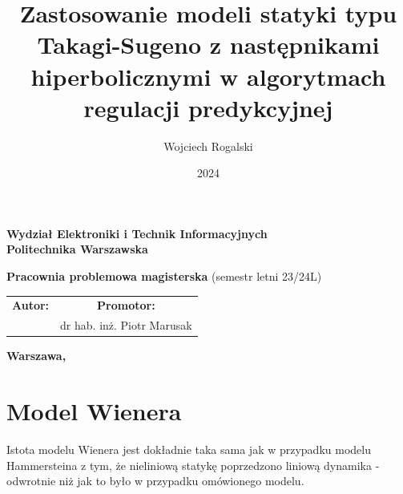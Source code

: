 \documentclass[a4paper,titlepage,11pt,floatssmall]{mwrep}
\begin{document}
\frenchspacing
\pagestyle{uheadings}

\title{\bf Zastosowanie modeli statyki typu Takagi-Sugeno z następnikami hiperbolicznymi w algorytmach regulacji predykcyjnej}
\author{Wojciech Rogalski}
\date{2024}

\makeatletter
\renewcommand{\maketitle}{\begin{titlepage}
\begin{center}{\LARGE {\bf
Wydział Elektroniki i Technik Informacyjnych}}\\
\vspace{0.4cm}
{\LARGE {\bf Politechnika Warszawska}}\\
\vspace{0.3cm}
\end{center}
\vspace{5cm}
\begin{center}
{\bf \LARGE Pracownia problemowa magisterska \vskip 0.1cm}
(semestr letni 23/24L)
\end{center}
\vspace{1cm}
\begin{center}
{\bf \LARGE \@title \vskip 0.1cm}
\end{center}
\vspace{2cm}
\begin{center}
\begin{tabular}{@{}c@{\hspace{2cm}}c@{}}
\bf \Large Autor: & \bf \Large Promotor: \\
\@author & dr hab. inż. Piotr Marusak
\end{tabular}
\end{center}
\vspace*{\stretch{6}}
\begin{center}
\bf{\large{Warszawa, \@date\vskip 0.1cm}}
\end{center}
\end{titlepage}
}
\makeatother
\maketitle
\tableofcontents





\chapter{Model Wienera}
Istota modelu Wienera jest dokładnie taka sama jak w przypadku modelu Hammersteina z tym, że nieliniową statykę poprzedzono liniową dynamika - odwrotnie niż jak to było w przypadku omówionego modelu.
\end{document}

